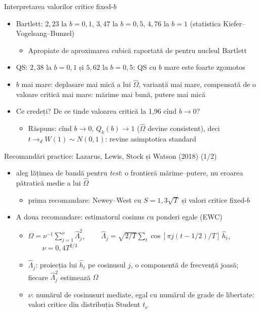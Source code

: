 \begin{frame}{Interpretarea valorilor critice fixed-$b$}
\itemsize{\small}
\begin{itemize}
    \item Bartlett: $2{,}23$ la $b = 0{,}1$, $3{,}47$ la $b = 0{,}5$, $4{,}76$ la $b = 1$ (statistica Kiefer--Vogelsang--Bunzel)
    \begin{itemize}
        \item Apropiate de aproximarea cubică raportată de  pentru nucleul Bartlett
    \end{itemize}
    \item QS: $2{,}38$ la $b = 0{,}1$ și $5{,}62$ la $b = 0{,}5$: QS cu $b$ mare este foarte zgomotos
    \item $b$ mai mare: deplasare mai mică a lui $\hat\Omega$, varianță mai mare, compensată de o valoare critică mai mare: mărime mai bună, putere mai mică
    \item Ce credeți? De ce tinde valoarea critică la 1,96 cînd $b \to 0$?
    \begin{itemize}
        \item Răspuns: cînd $b \to 0$, $Q_k(b) \to 1$ ($\hat\Omega$ devine consistent), deci $t \to_d W(1) \sim N(0,1)$: revine asimptotica standard
    \end{itemize}
\end{itemize}
\end{frame}

\begin{frame}{Recomandări practice: Lazarus, Lewis, Stock și Watson (2018) (1/2)}
\itemsize{\small}
\begin{itemize}
    \item {} aleg lățimea de bandă pentru \emph{test}: o frontieră mărime--putere, nu eroarea pătratică medie a lui $\hat\Omega$
    \begin{itemize}
        \item prima recomandare: Newey--West cu $S = 1{,}3\sqrt{T}$ și valori critice fixed-$b$
    \end{itemize}
    \item A doua recomandare: estimatorul cosinus cu ponderi egale (EWC)
    \begin{itemize}
        \item $\hat\Omega = \nu^{-1}\sum_{j=1}^{\nu}\hat\Lambda_j^2$, $\qquad \hat\Lambda_j = \sqrt{2/T}\sum_t \cos[\pi j(t - 1/2)/T]\,\hat h_t$, $\qquad \nu = 0{,}4T^{2/3}$
        \item $\hat\Lambda_j$: proiecția lui $\hat h_t$ pe cosinusul $j$, o componentă de frecvență joasă; fiecare $\hat\Lambda_j^2$ estimează $\Omega$
        \item $\nu$: numărul de cosinusuri mediate, egal cu numărul de grade de libertate: valori critice din distribuția Student $t_\nu$
    \end{itemize}
\end{itemize}
\end{frame}

